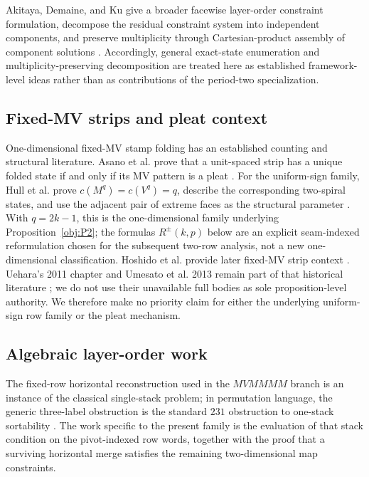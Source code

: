\documentclass[11pt]{article}
\theoremstyle{definition}
\theoremstyle{remark}
\begin{document}
Akitaya, Demaine, and Ku give a broader facewise layer-order constraint formulation, decompose the residual constraint system into independent components, and preserve multiplicity through Cartesian-product assembly of component solutions \cite{AkitayaDemaineKu2026}. Accordingly, general exact-state enumeration and multiplicity-preserving decomposition are treated here as established framework-level ideas rather than as contributions of the period-two specialization.

\subsection{Fixed-MV strips and pleat context}
One-dimensional fixed-MV stamp folding has an established counting and structural literature. Asano et al. prove that a unit-spaced strip has a unique folded state if and only if its MV pattern is a pleat \cite{AsanoEtAl2010}. For the uniform-sign family, Hull et al. prove $c(M^q)=c(V^q)=q$, describe the corresponding two-spiral states, and use the adjacent pair of extreme faces as the structural parameter \cite[Theorem~2.1 and the proof of Theorem~3.1]{HullEtAl2025}. With $q=2k-1$, this is the one-dimensional family underlying Proposition~\ref{obj:P2}; the formulas $R^\pm(k,p)$ below are an explicit seam-indexed reformulation chosen for the subsequent two-row analysis, not a new one-dimensional classification. Hoshido et al. provide later fixed-MV strip context \cite{HoshidoEtAl2025}. Uehara's 2011 chapter and Umesato et al. 2013 remain part of that historical literature \cite{Uehara2011,UmesatoEtAl2013}; we do not use their unavailable full bodies as sole proposition-level authority. We therefore make no priority claim for either the underlying uniform-sign row family or the pleat mechanism.

\subsection{Algebraic layer-order work}
The fixed-row horizontal reconstruction used in the $MVMMMM$ branch is an instance of the classical single-stack problem; in permutation language, the generic three-label obstruction is the standard $231$ obstruction to one-stack sortability \cite{Ulfarsson2012}. The work specific to the present family is the evaluation of that stack condition on the pivot-indexed row words, together with the proof that a surviving horizontal merge satisfies the remaining two-dimensional map constraints.
\end{document}
